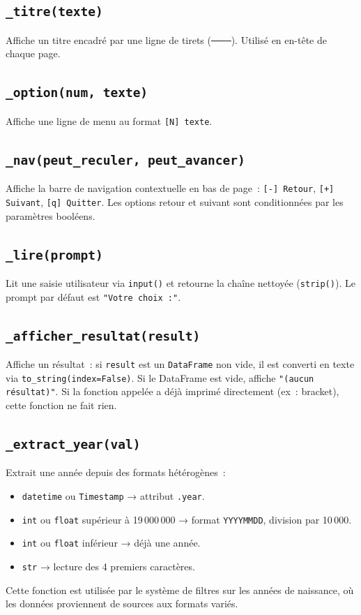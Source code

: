 \documentclass[12pt,a4paper]{article}
\begin{document}
\subsection{\texttt{\_titre(texte)}}
Affiche un titre encadré par une ligne de tirets (\texttt{────}).
Utilisé en en-tête de chaque page.

\subsection{\texttt{\_option(num, texte)}}
Affiche une ligne de menu au format \texttt{[N]  texte}.

\subsection{\texttt{\_nav(peut\_reculer, peut\_avancer)}}
Affiche la barre de navigation contextuelle en bas de page~:
\texttt{[-] Retour}, \texttt{[+] Suivant}, \texttt{[q] Quitter}.
Les options retour et suivant sont conditionnées par les paramètres
booléens.

\subsection{\texttt{\_lire(prompt)}}
Lit une saisie utilisateur via \texttt{input()} et retourne la chaîne
nettoyée (\texttt{strip()}). Le prompt par défaut est
\texttt{"Votre choix~:"}.

\subsection{\texttt{\_afficher\_resultat(result)}}
Affiche un résultat~: si \texttt{result} est un \texttt{DataFrame}
non vide, il est converti en texte via \texttt{to\_string(index=False)}.
Si le DataFrame est vide, affiche \texttt{"(aucun résultat)"}. Si la
fonction appelée a déjà imprimé directement (ex~: bracket), cette
fonction ne fait rien.

\subsection{\texttt{\_extract\_year(val)}}
Extrait une année depuis des formats hétérogènes~:
\begin{itemize}
    \item \texttt{datetime} ou \texttt{Timestamp} → attribut \texttt{.year}.
    \item \texttt{int} ou \texttt{float} supérieur à 19\,000\,000 →
    format \texttt{YYYYMMDD}, division par 10\,000.
    \item \texttt{int} ou \texttt{float} inférieur → déjà une année.
    \item \texttt{str} → lecture des 4 premiers caractères.
\end{itemize}
Cette fonction est utilisée par le système de filtres sur les années de
naissance, où les données proviennent de sources aux formats variés.
\end{document}
